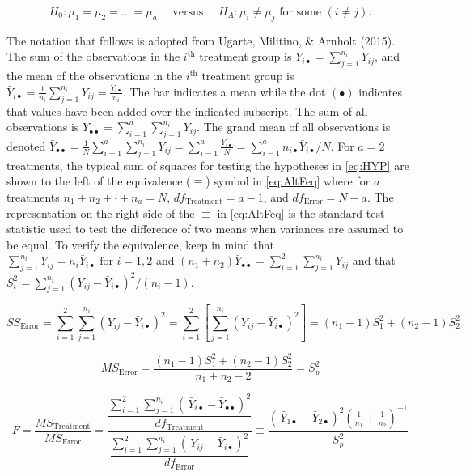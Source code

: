 \documentclass[
]{article}
\begin{document}
\begin{equation}
H_0: \mu_1=\mu_2= \dots = \mu_a\quad\text{ versus }\quad H_A:\mu_i \ne \mu_j \text{ for some }(i \neq j).
\label{eq:HYP}
\end{equation}

The notation that follows is adopted from Ugarte, Militino, \& Arnholt (2015). The sum of the observations in the \(i^\text{th}\) treatment group is \(Y_{i\bullet}=\sum_{j=1}^{n_i} Y_{ij}\), and the mean of the observations in the \(i^\text{th}\) treatment group is \(\bar{Y}_{i\bullet}=\frac{1}{n_{i}}\sum_{j=1}^{n_i} Y_{ij} = \frac{Y_{i\bullet}}{n_i}\). The bar indicates a mean while the dot \((\bullet)\) indicates that values have been added over the indicated subscript. The sum of all observations is \(Y_{\bullet\bullet}=\sum_{i=1}^a \sum_{j=1}^{n_i}Y_{ij}.\) The grand mean of all observations is denoted \(\bar{Y}_{\bullet\bullet}=\frac{1}{N}\sum_{i=1}^a \sum_{j=1}^{n_i}Y_{ij}=\sum_{i=1}^{a}\frac{Y_{i\bullet}}{N} =\sum_{i=1}^{a}n_{i\bullet}\bar{Y}_{i\bullet}/N.\) For \(a = 2\) treatments, the typical sum of squares for testing the hypotheses in \eqref{eq:HYP} are shown to the left of the equivalence (\(\equiv\)) symbol in \eqref{eq:AltFeq} where for \(a\) treatments \(n_1 + n_2 + \cdot + n_a = N\), \(df_{\text{Treatment}} = a - 1\), and \(df_{\text{Error}} = N-a\). The representation on the right side of the \(\equiv\) in \eqref{eq:AltFeq} is the standard test statistic used to test the difference of two means when variances are assumed to be equal. To verify the equivalence, keep in mind that \(\sum_{j=1}^{n_i} Y_{ij} = n_i \bar{Y}_{i\bullet} \text{ for } i=1,2\) and \((n_1 + n_2) \bar{Y}_{\bullet\bullet} = \sum_{i=1}^2 \sum_{j=1}^{n_i} Y_{ij}\) and that \(S_i^2 =\sum_{j=1}^{n_i}(Y_{ij} - \bar{Y}_{i\bullet})^2/(n_i - 1)\).

\begin{equation}
SS_\text{Error} = \sum_{i=1}^{2}\sum_{j=1}^{n_i}(Y_{ij} - \bar{Y}_{i\bullet})^2 = \sum_{i=1}^{2}\left[\sum_{j=1}^{n_i}(Y_{ij}- \bar{Y}_{i\bullet})^2\right] = (n_1 - 1)S_1^2 + (n_2 - 1)S_2^2
\label{eq:FE}
\end{equation}

\begin{equation}
MS_\text{Error} = \frac{(n_1 - 1)S_1^2 + (n_2 - 1)S_2^2}{n_1 + n_2 -2} = S_p^2
\label{eq:MFE}
\end{equation}

\begin{equation}
F = \frac{MS_\text{Treatment}}{MS_\text{Error}} = \dfrac{\dfrac{\sum_{i=1}^2 \sum_{j=1}^{n_i} (\,\bar{Y}_{i\bullet} - \bar{Y}_{\bullet\bullet})^2}{df_\text{Treatment}}}{\dfrac{\sum_{i=1}^2 \sum_{j=1}^{n_i}(\, Y_{ij}- \bar{Y}_{i\bullet})^2}{ df_\text{Error}}} \equiv \dfrac{(\,\bar{Y}_{1\bullet} -\bar{Y}_{2\bullet})^2 \left( \frac{1}{n_1} + \frac{1}{n_2} \right)^{-1}}{S^2_p}
\label{eq:AltFeq}
\end{equation}
\end{document}
